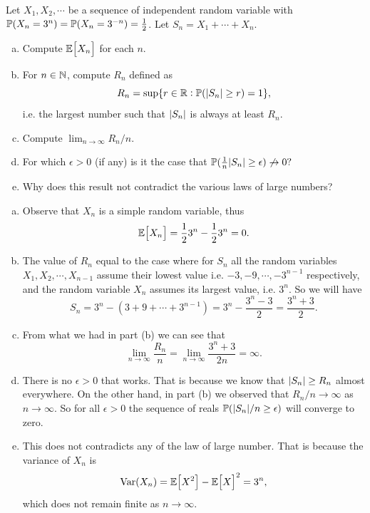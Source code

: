 \begin{problem}
	Let $ X_1,X_2,\cdots $ be a sequence of independent random variable with $ \mathbb{P}(X_n=3^n) = \mathbb{P}(X_n = 3^{-n}) = \frac{1}{2} $. Let $ S_n = X_1+\cdots+X_n $.
	\begin{enumerate}[(a)]
		\item Compute $ \mathbb{E}\big[X_n\big] $ for each $ n $.
		\item For $ n \in \mathbb{N} $, compute $ R_n $ defined as
		\[ R_n = \sup\{r\in\mathbb{R} : \mathbb{P}(|S_n|\geq r) = 1\}, \]
		i.e. the largest number such that $ |S_n| $ is always at least $ R_n $.
		\item Compute $ \lim_{n\to\infty}R_n/n $.
		\item For which $ \epsilon>0 $ (if any) is it the case that $ \mathbb{P}(\frac{1}{n}|S_n|\geq \epsilon)\not\to 0? $
		\item Why does this result not contradict the various laws of large numbers?
	\end{enumerate}
\end{problem}
\begin{solution}
	\begin{enumerate}[(a)]
		\item Observe that $ X_n $ is a simple random variable, thus
		\[ \mathbb{E}\big[X_n\big] = \frac{1}{2}3^n - \frac{1}{2}3^{n} = 0. \]
		
		\item The value of $ R_n $ equal to the case where for $ S_n $ all the random variables $ X_1,X_2,\cdots, X_{n-1} $ assume their lowest value i.e. $ -3,-9,\cdots,-3^{n-1} $ respectively, and the random variable $ X_n $ assumes its largest value, i.e. $ 3^n $.
		So we will have
		\[ S_n = 3^n - (3+9+\cdots+3^{n-1}) = 3^n - \frac{3^n-3}{2} = \frac{3^n+3}{2}. \]
		
		\item From what we had in part (b) we can see that
		\[ \lim_{n\to\infty}\frac{R_n}{n} = \lim_{n\to\infty}\frac{3^n + 3}{2n} = \infty. \]
		
		\item There is no $ \epsilon>0 $ that works. That is because we know that $ |S_n| \geq R_n $ almost everywhere. On the other hand, in part (b) we observed that $ R_n/n \to \infty$ as $ n\to\infty $. So for all $ \epsilon>0 $ the sequence of reals $ \mathbb{P}(|S_n|/n\geq \epsilon) $ will converge to zero.
		
		\item This does not contradicts any of the law of large number. That is because the variance of $ X_n $ is
		\[ \operatorname{Var}(X_n) = \mathbb{E}\big[X^2\big] - \mathbb{E}\big[X\big]^2 = 3^n, \]
		which does not remain finite as $ n\to\infty $.
	\end{enumerate}
\end{solution}

